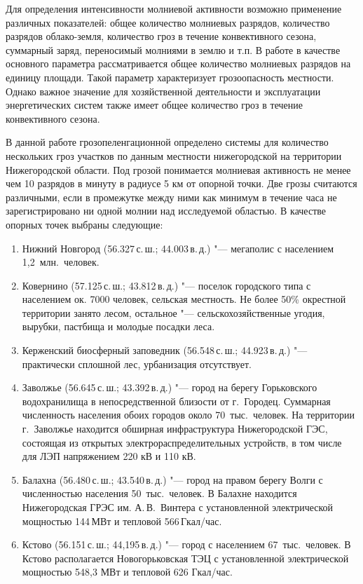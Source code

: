 Для определения интенсивности молниевой активности возможно применение различных показателей: общее количество молниевых разрядов, количество разрядов облако-земля, количество гроз в течение конвективного сезона, суммарный заряд, переносимый молниями в землю и т.п. В работе \cite{BulatovMiG} в качестве основного параметра рассматривается общее количество молниевых разрядов на единицу площади. Такой параметр характеризует грозоопасность местности. Однако важное значение для хозяйственной деятельности и эксплуатации энергетических систем также имеет общее количество гроз в течение конвективного сезона.

В данной работе грозопеленгационной определено системы для количество нескольких гроз участков по данным местности нижегородской на территории Нижегородской области. Под грозой понимается молниевая активность не менее чем 10 разрядов в минуту в радиусе 5 км от опорной точки. Две грозы считаются различными, если в промежутке между ними как минимум в течение часа не зарегистрировано ни одной молнии над исследуемой областью. В качестве опорных точек выбраны следующие:
\begin{enumerate}
	\item Нижний Новгород (56.327\textdegree\,с.\,ш.; 44.003\textdegree\,в.\,д.) "--- мегаполис с населением 1,2~млн.~человек.
	\item Ковернино (57.125\textdegree\,с.\,ш.; 43.812\textdegree\,в.\,д.) "--- поселок городского типа с населением ок.
	7000 человек, сельская местность. Не более 50\% окрестной территории занято	лесом, остальное "--- сельскохозяйственные угодия, вырубки, пастбища и молодые посадки леса.
	\item Керженский биосферный заповедник (56.548\textdegree\,с.\,ш.; 44.923\textdegree\,в.\,д.) "--- практически
	сплошной лес, урбанизация отсутствует.
	\item Заволжье (56.645\textdegree\,с.\,ш.; 43.392\textdegree\,в.\,д.) "--- город на берегу Горьковского водохранилища в непосредственной близости от г.~Городец. Суммарная численность населения обоих городов около 70~тыс.~человек. На территории г.~Заволжье находится обширная инфраструктура Нижегородской ГЭС, состоящая из открытых электрораспределительных устройств, в том числе для ЛЭП напряжением 220 кВ и 110 кВ.
	\item Балахна (56.480\textdegree\,с.\,ш.; 43.540\textdegree\,в.\,д.) "--- город на правом берегу Волги с численностью населения 50~тыс.~человек. В Балахне находится Нижегородская ГРЭС им. А.\,В.~Винтера с установленной электрической мощностью 144\,МВт и тепловой 566\,Гкал/час.
	\item Кстово (56.151\textdegree\,с.\,ш.; 44,195\textdegree\,в.\,д.) "--- город с населением 67~тыс.~человек. В Кстово
	располагается Новогорьковская ТЭЦ с установленной электрической мощностью
	548,3 МВт и тепловой 626 Гкал/час.
\end{enumerate}

